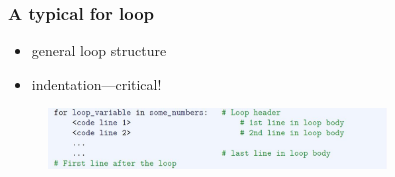 \documentclass[english,14pt]{beamer}
\begin{document}

\begin{frame}[fragile]

\frametitle{A typical for loop}

\begin{itemize}
	\item general loop structure
	\item indentation---critical!
\end{itemize}

\begin{figure}[ht]
	\centering
	\includegraphics[width=0.8\textwidth]{figures/LLp60c}
\end{figure}



\end{frame}

\end{document}
